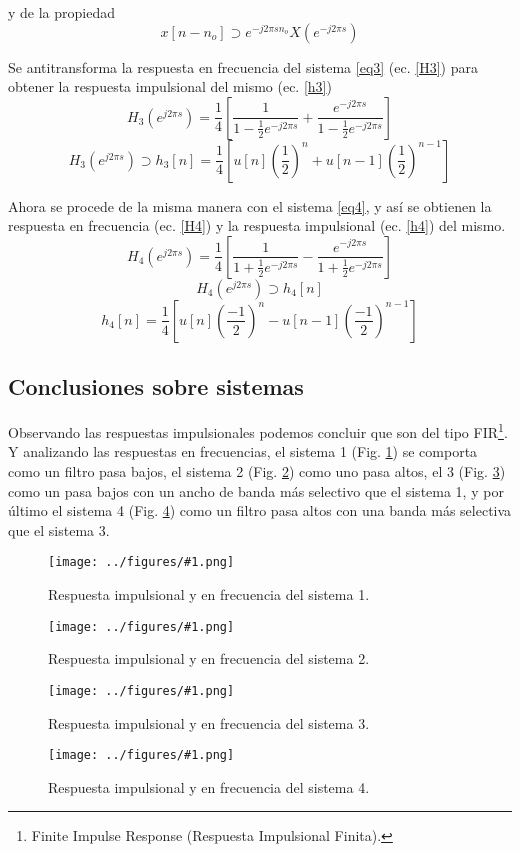 \documentclass[letterpaper, 10 pt, conference]{ieeeconf}  %
\newcommand{\image}[2] {
  \begin{figure}[H]
    \centering
    \texttt{[image: ../figures/\#1.png]}
    \caption{#2}
    \label{fig:#1}
  \end{figure}
}
\begin{document}
y de la propiedad
\begin{equation*}
  x[n-n_o] \supset e^{-j2{\pi}sn_o}X(e^{-j2{\pi}s})
\end{equation*}

Se antitransforma la respuesta en frecuencia del sistema \ref{eq3} (ec. \ref{H3}) para obtener la respuesta impulsional del mismo (ec. \ref{h3})
\begin{equation*}
  H_3(e^{j2{\pi}s}) = \frac{1}{4}[\frac{1}{1 - \frac{1}{2}e^{-j2{\pi}s}} + \frac{e^{-j2{\pi}s}}{1 - \frac{1}{2}e^{-j2{\pi}s}}]
\end{equation*}
\begin{equation} \label{h3}
  H_3(e^{j2{\pi}s}) \supset h_3[n] = \frac{1}{4} [ u[n](\frac{1}{2})^n + u[n-1](\frac{1}{2})^{n-1} ]
\end{equation}

Ahora se procede de la misma manera con el sistema \ref{eq4}, y as\'i se obtienen la respuesta en frecuencia (ec. \ref{H4}) y la respuesta impulsional (ec. \ref{h4}) del mismo.
\begin{equation} \label{H4}
  H_4(e^{j2{\pi}s}) = \frac{1}{4}[ \frac{1}{1+\frac{1}{2}e^{-j2{\pi}s}} - \frac{e^{-j2{\pi}s}}{1+\frac{1}{2}e^{-j2{\pi}s}} ]
\end{equation}
\begin{equation*}
  H_4(e^{j2{\pi}s}) \supset h_4[n]
\end{equation*}
\begin{equation} \label{h4}
  h_4[n] = \frac{1}{4} [ u[n](\frac{-1}{2})^n - u[n-1](\frac{-1}{2})^{n-1} ]
\end{equation}

\subsection{Conclusiones sobre sistemas} \label{subsec:conclusiones-sistemas}
Observando las respuestas impulsionales podemos concluir que son del tipo FIR\footnote{Finite Impulse Response (Respuesta Impulsional Finita).}. \\
Y analizando las respuestas en frecuencias, el sistema 1 (Fig. \ref{fig:resp_sist_1}) se comporta como un filtro pasa bajos, el sistema 2 (Fig. \ref{fig:resp_sist_2}) como uno pasa altos, el 3 (Fig. \ref{fig:resp_sist_3}) como un pasa bajos con un ancho de banda m\'as selectivo que el sistema 1, y por \'ultimo el sistema 4 (Fig. \ref{fig:resp_sist_4}) como un filtro pasa altos con una banda m\'as selectiva que el sistema 3.
\image{resp_sist_1}{Respuesta impulsional y en frecuencia del sistema 1.}
\image{resp_sist_2}{Respuesta impulsional y en frecuencia del sistema 2.}
\image{resp_sist_3}{Respuesta impulsional y en frecuencia del sistema 3.}
\image{resp_sist_4}{Respuesta impulsional y en frecuencia del sistema 4.}
\end{document}

